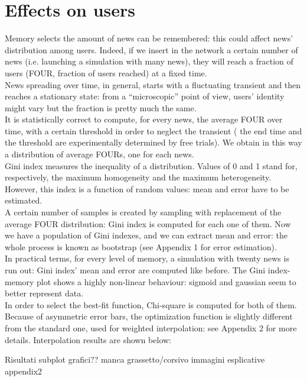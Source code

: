 \section{Effects on users}
Memory selects the amount of news can be remembered: this could affect news' distribution among users.
Indeed, if we insert in the network a certain number of news (i.e. launching a simulation with many news), they will reach a fraction of users (FOUR, fraction of users reached) at a fixed time.\\
News spreading over time, in general, starts with a fluctuating transient and then reaches a stationary state: from a ``microscopic'' point of view, users' identity might vary but the fraction is pretty much the same. \\
It is statistically correct to compute, for every news, the average FOUR over time, with a certain threshold in order to neglect the transient ( the end time and the threshold are experimentally determined by free trials).
We obtain in this  way a distribution of average FOURs, one for each news.\\
Gini index measures the inequality of a distribution. Values of 0 and 1 stand for, respectively, the maximum homogeneity and the maximum heterogeneity.
However, this index is a function of random values: mean and error have to be estimated.\\
A certain number of samples is created by sampling with replacement of the average FOUR distribution: Gini index is computed for each one of them.
Now we have a population of Gini indexes, and we can extract mean and error: the whole process is known as bootstrap (see Appendix 1 for error estimation).\\
In practical terms, for every level of  memory, a simulation with twenty news is run out: Gini index' mean and error are computed like before.
The Gini index-memory plot shows a highly non-linear behaviour: sigmoid and gaussian seem to better represent data.\\
 In order to select the best-fit function, Chi-square is computed for both of them. \\
Because of asymmetric error bars, the optimization function is slightly different from the standard one, used for weighted interpolation: see Appendix 2 for more details.
Interpolation results are shown below:


Risultati
subplot grafici??
manca grassetto/corsivo
immagini esplicative appendix2
